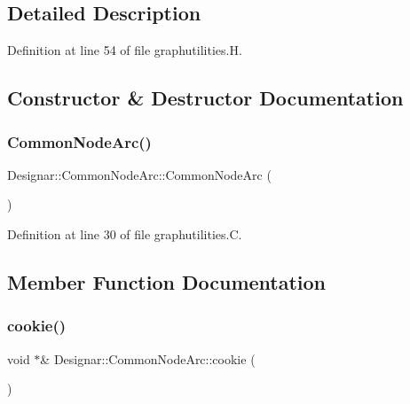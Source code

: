 \subsection{Detailed Description}


Definition at line 54 of file graphutilities.\+H.



\subsection{Constructor \& Destructor Documentation}
\mbox{\label{class_designar_1_1_common_node_arc_a7b0794f171cc8ad5b5e4c28216366c53}} 
\subsubsection{\texorpdfstring{Common\+Node\+Arc()}{CommonNodeArc()}}
{\footnotesize\ttfamily Designar\+::\+Common\+Node\+Arc\+::\+Common\+Node\+Arc (\begin{DoxyParamCaption}{ }\end{DoxyParamCaption})}



Definition at line 30 of file graphutilities.\+C.



\subsection{Member Function Documentation}
\mbox{\label{class_designar_1_1_common_node_arc_a385a91e2bddd8a6f69d418b36b2cf11e}} 
\subsubsection{\texorpdfstring{cookie()}{cookie()}}
{\footnotesize\ttfamily void $\ast$\& Designar\+::\+Common\+Node\+Arc\+::cookie (\begin{DoxyParamCaption}{ }\end{DoxyParamCaption})}



